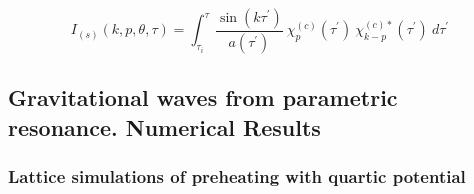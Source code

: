 \begin{equation}
    I_{(s)} (k, p, \theta, \tau) = \int_{\tau_{i}}^\tau  \frac{\sin (k\tau^\prime)}{a \left( \tau^\prime \right)} ~ \chi^{(c)}_{p} (\tau^\prime) ~ \chi_{k - p}^{(c) *} (\tau^\prime) ~ d\tau^\prime
\end{equation}

\subsection{Gravitational waves from parametric resonance. Numerical Results}

\subsubsection{Lattice simulations of preheating with quartic potential}